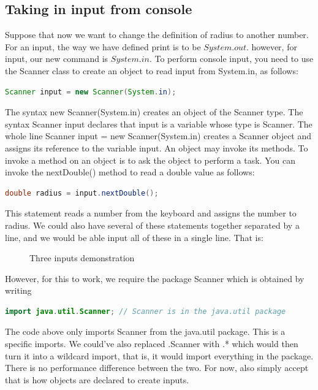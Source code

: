 \documentclass[11pt,a4 paper]{book}
\theoremstyle{plain}
\theoremstyle{definition}
\theoremstyle{remark}
\begin{document}
\begin{flushleft}
\section{Taking in input from console}
Suppose that now we want to change the definition of radius to another number. For an input, the way we have defined print is to be $System.out$. however, for input, our new command is $System.in$. To perform console input, you need to use the Scanner class to create an object to read input from System.in, as follows:
\begin{lstlisting}[language = Java]
Scanner input = new Scanner(System.in);
\end{lstlisting}
The syntax new Scanner(System.in) creates an object of the Scanner type. The syntax Scanner input declares that input is a variable whose type is Scanner. The whole line Scanner input = new Scanner(System.in) creates a Scanner object and assigns its reference to the variable input. An object may invoke its methods. To invoke a method on an object is to ask the object to perform a task. You can invoke the nextDouble() method to read a double value as follows:
\begin{lstlisting}[language = Java]
double radius = input.nextDouble();
\end{lstlisting}
This statement reads a number from the keyboard and assigns the number to radius. We could also have several of these statements together separated by a line, and we would be able input all of these in a single line. That is:

\begin{figure}[H]
\centering
{}
\label{fig:input}
\caption{Three inputs demonstration}
\end{figure} 
 However, for this to work, we require the package Scanner which is obtained by writing
\begin{lstlisting}[language= Java]
import java.util.Scanner; // Scanner is in the java.util package
\end{lstlisting}
The code above only imports Scanner from the java.util package. This is a specific imports. We could've also replaced .Scanner with .* which would  then turn it into a wildcard import, that is, it would import everything in the package. There is no performance difference between the two. For now, also simply accept that is how objects are declared to create inputs.

\end{flushleft}
\end{document}
